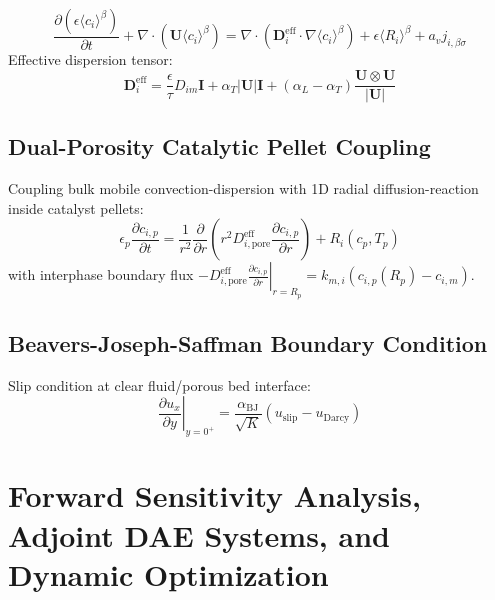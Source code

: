 \documentclass[11pt,a4paper]{article}
\begin{document}
\begin{equation}
\frac{\partial (\epsilon \langle c_i \rangle^\beta)}{\partial t} + \nabla \cdot (\mathbf{U} \langle c_i \rangle^\beta) = \nabla \cdot \left( \mathbf{D}_i^{\text{eff}} \cdot \nabla \langle c_i \rangle^\beta \right) + \epsilon \langle R_i \rangle^\beta + a_v j_{i, \beta\sigma}
\end{equation}
Effective dispersion tensor:
\begin{equation}
\mathbf{D}_i^{\text{eff}} = \frac{\epsilon}{\tau} D_{im} \mathbf{I} + \alpha_T |\mathbf{U}| \mathbf{I} + (\alpha_L - \alpha_T) \frac{\mathbf{U} \otimes \mathbf{U}}{|\mathbf{U}|}
\end{equation}

\subsection{Dual-Porosity Catalytic Pellet Coupling}
\label{subsec:dual-porosity}

Coupling bulk mobile convection-dispersion with 1D radial diffusion-reaction inside catalyst pellets:
\begin{equation}
\epsilon_p \frac{\partial c_{i, p}}{\partial t} = \frac{1}{r^2} \frac{\partial}{\partial r}\left( r^2 D_{i, \text{pore}}^{\text{eff}} \frac{\partial c_{i, p}}{\partial r} \right) + R_i(c_p, T_p)
\end{equation}
with interphase boundary flux $-D_{i, \text{pore}}^{\text{eff}} \left. \frac{\partial c_{i, p}}{\partial r} \right|_{r=R_p} = k_{m, i} (c_{i, p}(R_p) - c_{i, m})$.

\subsection{Beavers-Joseph-Saffman Boundary Condition}
\label{subsec:beavers-joseph}

Slip condition at clear fluid/porous bed interface:
\begin{equation}
\left. \frac{\partial u_x}{\partial y} \right|_{y=0^+} = \frac{\alpha_{\text{BJ}}}{\sqrt{K}} \left( u_{\text{slip}} - u_{\text{Darcy}} \right)
\end{equation}


\section{Forward Sensitivity Analysis, Adjoint DAE Systems, and Dynamic Optimization}
\label{sec:sensitivity-adjoint-optimization}
\end{document}
